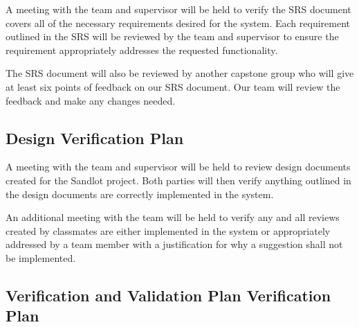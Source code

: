 \documentclass[12pt, titlepage]{article}
\begin{document}


A meeting with the team and supervisor will be held to verify the SRS document covers all of
the necessary requirements desired for the system. Each requirement outlined in the SRS will
be reviewed by the team and supervisor to ensure the requirement appropriately addresses the
requested functionality.

The SRS document will also be reviewed by another capstone group who will give
at least six points of feedback on our SRS document. Our team will review the
feedback and make any changes needed.

\subsection{Design Verification Plan}




A meeting with the team and supervisor will be held to review design documents created
for the Sandlot project. Both parties will then verify anything outlined in the design
documents are correctly implemented in the system.

An additional meeting with the team will be held to verify any and all reviews created by
classmates are either implemented in the system or appropriately addressed by a team member
with a justification for why a suggestion shall not be implemented.

\subsection{Verification and Validation Plan Verification Plan}


\end{document}
